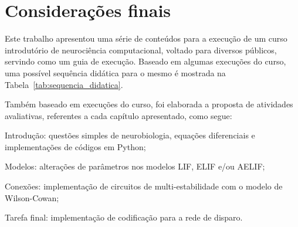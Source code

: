 \chapter{Considerações finais}\label{cap:conclusoes}
Este trabalho apresentou uma série de conteúdos para a execução de um curso introdutório de neurociência computacional, voltado para diversos públicos, servindo como um guia de execução. Baseado em algumas execuções do curso, uma possível sequência didática para o mesmo é mostrada na Tabela~\ref{tab:sequencia_didatica}.
\begin{table}[tb]
\end{table}
Também baseado em execuções do curso, foi elaborada a proposta de atividades avaliativas, referentes a cada capítulo apresentado, como segue:
\begin{alineas}
	\item Introdução: questões simples de neurobiologia, equações diferenciais e implementações de códigos em Python;
	\item Modelos: alterações de parâmetros nos modelos LIF, ELIF e/ou AELIF;
	\item Conexões: implementação de circuitos de multi-estabilidade com o modelo de Wilson-Cowan;
	\item Tarefa final: implementação de codificação para a rede de disparo.
\end{alineas}

